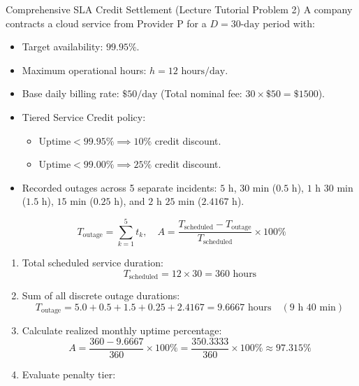 \begin{solved}{Comprehensive SLA Credit Settlement (Lecture Tutorial Problem 2)}
\Given A company contracts a cloud service from Provider P for a $D = 30\text{-day}$ period with:
\begin{itemize}
  \item Target availability: $99.95\%$.
  \item Maximum operational hours: $h = 12\text{ hours/day}$.
  \item Base daily billing rate: $\$50/\text{day}$ (Total nominal fee: $30 \times \$50 = \$1500$).
  \item Tiered Service Credit policy:
    \begin{itemize}
      \item $\text{Uptime} < 99.95\% \implies 10\%$ credit discount.
      \item $\text{Uptime} < 99.00\% \implies 25\%$ credit discount.
    \end{itemize}
  \item Recorded outages across 5 separate incidents:
    $5\text{ h}$, $30\text{ min}$ ($0.5\text{ h}$), $1\text{ h } 30\text{ min}$ ($1.5\text{ h}$), $15\text{ min}$ ($0.25\text{ h}$), and $2\text{ h } 25\text{ min}$ ($2.4167\text{ h}$).
\end{itemize}
\Formula
\begin{equation}
T_{\text{outage}} = \sum_{k=1}^{5} t_k, \quad A = \frac{T_{\text{scheduled}} - T_{\text{outage}}}{T_{\text{scheduled}}} \times 100\%
\end{equation}
\Steps
\begin{enumerate}[leftmargin=*]
  \item Total scheduled service duration:
  \begin{equation}
  T_{\text{scheduled}} = 12 \times 30 = 360\text{ hours}
  \end{equation}
  \item Sum of all discrete outage durations:
  \begin{equation}
  T_{\text{outage}} = 5.0 + 0.5 + 1.5 + 0.25 + 2.4167 = 9.6667\text{ hours} \quad (9\text{ h } 40\text{ min})
  \end{equation}
  \item Calculate realized monthly uptime percentage:
  \begin{equation}
  A = \frac{360 - 9.6667}{360} \times 100\% = \frac{350.3333}{360} \times 100\% \approx 97.315\%
  \end{equation}
  \item Evaluate penalty tier:

\end{enumerate}
\end{solved}
